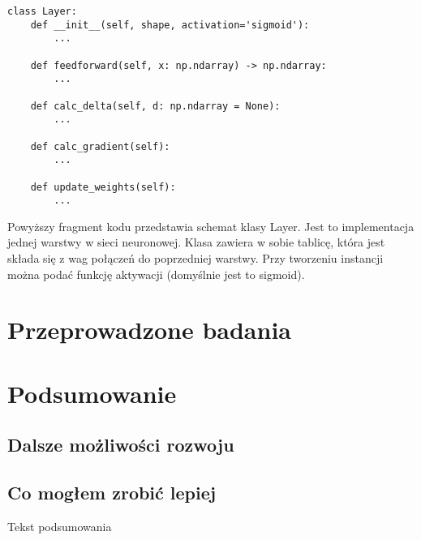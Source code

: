 \begin{verbatim}
class Layer:
    def __init__(self, shape, activation='sigmoid'):
        ...

    def feedforward(self, x: np.ndarray) -> np.ndarray:
        ...

    def calc_delta(self, d: np.ndarray = None):
        ...

    def calc_gradient(self):
        ...

    def update_weights(self):
        ...
\end{verbatim}
\label{Schemat klasy Layer}

Powyższy fragment kodu przedstawia schemat klasy Layer. Jest to implementacja jednej warstwy w sieci neuronowej.
Klasa zawiera w sobie tablicę, która jest składa się z wag połączeń do poprzedniej warstwy.
Przy tworzeniu instancji można podać funkcję aktywacji (domyślnie jest to sigmoid).



\chapter{Przeprowadzone badania}

\chapter{Podsumowanie}

\section{Dalsze możliwości rozwoju}

\section{Co mogłem zrobić lepiej}

Tekst podsumowania




\listoffigures
\listoftables


